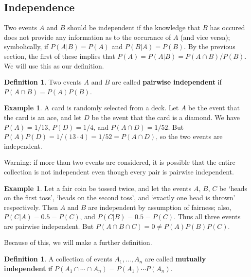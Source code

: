 \documentclass[a4paper,leqno]{article}
\numberwithin{equation}{section}
\theoremstyle{definition}
\newtheorem{defn}[equation]{Definition}
\newtheorem{ex}[equation]{Example}
\theoremstyle{remark}
\newcommand{\df}{\textbf}
\newcommand{\inter}{\cap}
\begin{document}
\subsection{Independence}
Two events $ A $ and $ B $ should be independent if the knowledge that $ B $ has occured does not provide any information
as to the occurance of $ A $ (and vice versa); symbolically, if $ P(A | B) = P(A) $ and $ P(B | A) = P(B) $. By the previous
section, the first of these implies that $ P(A) = P(A | B) = P(A \inter B)/P(B) $. We will use this as our definition.

\begin{defn}
  Two events $ A $ and $ B $ are called \df{pairwise independent} if $ P(A \inter B) = P(A) P(B) $.
\end{defn}
\begin{ex}
  A card is randomly selected from a deck. Let $ A $ be the event that the card is an ace, and let $ D $ be the event that the
  card is a diamond. We have $ P(A) = 1/13 $, $ P(D) = 1/4 $, and $ P(A \inter D) = 1/52 $. But $ P(A) P(D) = 1/(13 \cdot 4) = 1/52 = P(A \inter D) $,
  so the two events are independent.
\end{ex}

Warning: if more than two events are considered, it is possible that the entire collection is not independent even though
every pair is pairwise independent.

\begin{ex}
  Let a fair coin be tossed twice, and let the events $ A $, $ B $, $ C $ be `heads on the first toss', `heads on the second toss',
  and `exactly one head is thrown' respectively. Then $ A $ and $ B $ are independent by assumption of fairness; also, $ P(C | A) = 0.5 = P(C) $,
  and $ P(C | B) = 0.5 = P(C) $. Thus all three events are pairwise independent. But $ P(A \inter B \inter C) = 0 \neq P(A)P(B)P(C) $.
\end{ex}

Because of this, we will make a further definition.
\begin{defn}
  A collection of events $ A_1,...,A_n $ are called \df{mutually independent} if $ P(A_1 \inter\cdots \inter A_n) = P(A_1) \cdots P(A_n) $.
\end{defn}
\end{document}

